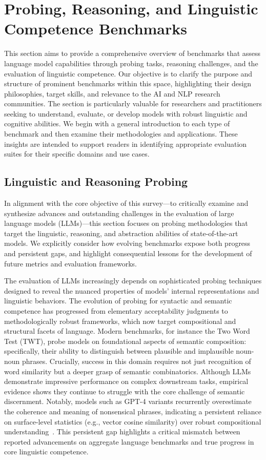 \documentclass[sigconf]{acmart}
\begin{document}
\section{Probing, Reasoning, and Linguistic Competence Benchmarks}

This section aims to provide a comprehensive overview of benchmarks that assess language model capabilities through probing tasks, reasoning challenges, and the evaluation of linguistic competence. Our objective is to clarify the purpose and structure of prominent benchmarks within this space, highlighting their design philosophies, target skills, and relevance to the AI and NLP research communities. The section is particularly valuable for researchers and practitioners seeking to understand, evaluate, or develop models with robust linguistic and cognitive abilities. We begin with a general introduction to each type of benchmark and then examine their methodologies and applications. These insights are intended to support readers in identifying appropriate evaluation suites for their specific domains and use cases.

\subsection{Linguistic and Reasoning Probing}

In alignment with the core objective of this survey---to critically examine and synthesize advances and outstanding challenges in the evaluation of large language models (LLMs)---this section focuses on probing methodologies that target the linguistic, reasoning, and abstraction abilities of state-of-the-art models. We explicitly consider how evolving benchmarks expose both progress and persistent gaps, and highlight consequential lessons for the development of future metrics and evaluation frameworks.

The evaluation of LLMs increasingly depends on sophisticated probing techniques designed to reveal the nuanced properties of models' internal representations and linguistic behaviors. The evolution of probing for syntactic and semantic competence has progressed from elementary acceptability judgments to methodologically robust frameworks, which now target compositional and structural facets of language. Modern benchmarks, for instance the Two Word Test (TWT), probe models on foundational aspects of semantic composition: specifically, their ability to distinguish between plausible and implausible noun-noun phrases. Crucially, success in this domain requires not just recognition of word similarity but a deeper grasp of semantic combinatorics. Although LLMs demonstrate impressive performance on complex downstream tasks, empirical evidence shows they continue to struggle with the core challenge of semantic discernment. Notably, models such as GPT-4 variants recurrently overestimate the coherence and meaning of nonsensical phrases, indicating a persistent reliance on surface-level statistics (e.g., vector cosine similarity) over robust compositional understanding~\cite{ref96}. This persistent gap highlights a critical mismatch between reported advancements on aggregate language benchmarks and true progress in core linguistic competence.
\end{document}

